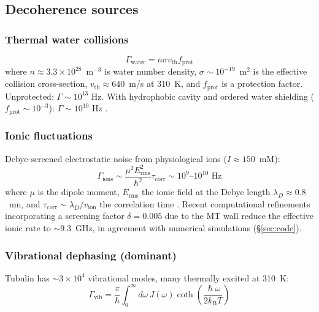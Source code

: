 \documentclass[twocolumn,10pt]{article}
\renewcommand{\hbar}{\hslash}
\newcommand{\kB}{k_{\text{B}}}
\newcommand{\Hz}{\text{~Hz}}
\begin{document}
\subsection{Decoherence sources}

\subsubsection{Thermal water collisions}

\begin{equation}
\Gamma_{\text{water}} = n \sigma v_{\text{th}} f_{\text{prot}}
\end{equation}
where $n \approx 3.3 \times 10^{28}$~m$^{-3}$ is water number density,
$\sigma \sim 10^{-19}$~m$^2$ is the effective collision cross-section,
$v_{\text{th}} \approx 640$~m/s at 310~K, and $f_{\text{prot}}$ is a
protection factor. Unprotected: $\Gamma \sim 10^{13}\Hz$. With hydrophobic
cavity and ordered water shielding ($f_{\text{prot}} \sim 10^{-3}$):
$\Gamma \sim 10^{10}\Hz$ \cite{Eaves2005}.


\subsubsection{Ionic fluctuations}

Debye-screened electrostatic noise from physiological ions
($I \approx 150$~mM):
\begin{equation}
\Gamma_{\text{ions}} \sim \frac{\mu^2 E_{\text{rms}}^2}{\hbar^2}
\tau_{\text{corr}} \sim 10^{9}\text{--}10^{10}\Hz
\end{equation}
where $\mu$ is the dipole moment, $E_{\text{rms}}$ the ionic field at the
Debye length $\lambda_D \approx 0.8$~nm, and
$\tau_{\text{corr}} \sim \lambda_D / v_{\text{ion}}$ the correlation time
\cite{Hagan2002,Xiang2019,Israelachvili2011}. Recent computational
refinements incorporating a screening factor $\delta = 0.005$ due to the
MT wall reduce the effective ionic rate to $\sim 9.3$~GHz, in agreement
with numerical simulations (\S\ref{sec:code}).


\subsubsection{Vibrational dephasing (dominant)}

Tubulin has $\sim 3 \times 10^4$ vibrational modes, many thermally excited
at 310~K:
\begin{equation}
\Gamma_{\text{vib}} = \frac{\pi}{\hbar} \int_0^\infty d\omega \, J(\omega)
\coth\!\left(\frac{\hbar\omega}{2\kB T}\right)
\label{eq:Gamma_vib_full}
\end{equation}
\end{document}
